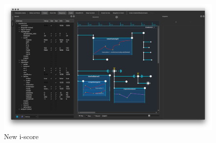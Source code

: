 \documentclass[12pt,t]{beamer}
\makeatletter
\newcommand*{\currentname}{\@currentlabelname}
\makeatother
\begin{document}
\begin{frame}
    \frametitle{\currentname}
    \centering
    \begin{figure}
        \includegraphics[scale=0.20]{images/General.png}
        \caption{New i-score}
    \end{figure}
\end{frame}
\end{document}

